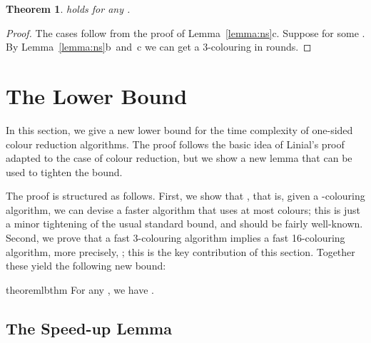 \documentclass[a4paper,11pt]{article}
\newtheorem{theorem}{Theorem}
\theoremstyle{remark}
\begin{document}
\begin{theorem}\label{thm:ub}
  holds for any .
\end{theorem}
\begin{proof}
The cases  follow from the proof of Lemma~\ref{lemma:ns}c. Suppose  for some . By Lemma~\ref{lemma:ns}b~and~c we can get a 3-colouring in  rounds.
\end{proof}

\section{The Lower Bound}\label{sec:lb}

In this section, we give a new lower bound for the time complexity of one-sided colour reduction algorithms. The proof follows the basic idea of Linial's proof~\cite{linial92locality} adapted to the case of colour reduction, but we show a new lemma that can be used to tighten the bound.

The proof is structured as follows. First, we show that , that is, given a -colouring algorithm, we can devise a faster algorithm that uses at most  colours; this is just a minor tightening of the usual standard bound, and should be fairly well-known. Second, we prove that a fast 3-colouring algorithm implies a fast 16-colouring algorithm, more precisely, ; this is the key contribution of this section. Together these yield the following new bound:

\begin{restatable}{theorem}{lbthm}
\label{thm:lb}
 For any , we have .
\end{restatable}

\subsection{The Speed-up Lemma\label{sec:speedup}}
\end{document}
